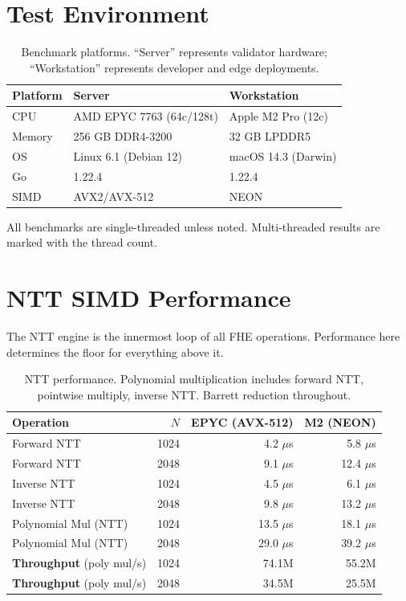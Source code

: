 \documentclass[11pt]{article}
\begin{document}
\section{Test Environment}

\begin{table}[h]
\centering
\begin{tabular}{@{}lll@{}}
\toprule
\textbf{Platform} & \textbf{Server} & \textbf{Workstation} \\
\midrule
CPU & AMD EPYC 7763 (64c/128t) & Apple M2 Pro (12c) \\
Memory & 256 GB DDR4-3200 & 32 GB LPDDR5 \\
OS & Linux 6.1 (Debian 12) & macOS 14.3 (Darwin) \\
Go & 1.22.4 & 1.22.4 \\
SIMD & AVX2/AVX-512 & NEON \\
\bottomrule
\end{tabular}
\caption{Benchmark platforms. ``Server'' represents validator hardware; ``Workstation'' represents developer and edge deployments.}
\label{tab:platforms}
\end{table}

All benchmarks are single-threaded unless noted. Multi-threaded results are marked with the thread count.

\section{NTT SIMD Performance}

The NTT engine is the innermost loop of all FHE operations. Performance here determines the floor for everything above it.

\begin{table}[h]
\centering
\begin{tabular}{@{}lrrr@{}}
\toprule
\textbf{Operation} & \textbf{$N$} & \textbf{EPYC (AVX-512)} & \textbf{M2 (NEON)} \\
\midrule
Forward NTT & 1024 & 4.2 $\mu$s & 5.8 $\mu$s \\
Forward NTT & 2048 & 9.1 $\mu$s & 12.4 $\mu$s \\
Inverse NTT & 1024 & 4.5 $\mu$s & 6.1 $\mu$s \\
Inverse NTT & 2048 & 9.8 $\mu$s & 13.2 $\mu$s \\
Polynomial Mul (NTT) & 1024 & 13.5 $\mu$s & 18.1 $\mu$s \\
Polynomial Mul (NTT) & 2048 & 29.0 $\mu$s & 39.2 $\mu$s \\
\midrule
\textbf{Throughput} (poly mul/s) & 1024 & 74.1M & 55.2M \\
\textbf{Throughput} (poly mul/s) & 2048 & 34.5M & 25.5M \\
\bottomrule
\end{tabular}
\caption{NTT performance. Polynomial multiplication includes forward NTT, pointwise multiply, inverse NTT. Barrett reduction throughout.}
\label{tab:ntt}
\end{table}
\end{document}

